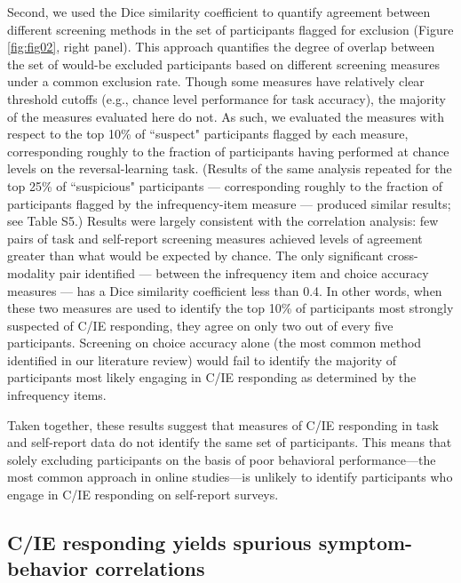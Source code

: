 \documentclass[a4paper,notitlepage,12pt]{article}
\begin{document}
Second, we used the Dice similarity coefficient to quantify agreement between different screening methods in the set of participants flagged for exclusion (Figure \ref{fig:fig02}, right panel). This approach quantifies the degree of overlap between the set of would-be excluded participants based on different screening measures under a common exclusion rate. Though some measures have relatively clear threshold cutoffs (e.g., chance level performance for task accuracy), the majority of the measures evaluated here do not. As such, we evaluated the measures with respect to the top 10\% of ``suspect" participants flagged by each measure, corresponding roughly to the fraction of participants having performed at chance levels on the reversal-learning task. (Results of the same analysis repeated for the top 25\% of ``suspicious" participants --- corresponding roughly to the fraction of participants flagged by the infrequency-item measure --- produced similar results; see Table S5.) Results were largely consistent with the correlation analysis: few pairs of task and self-report screening measures achieved levels of agreement greater than what would be expected by chance. The only significant cross-modality pair identified --- between the infrequency item and choice accuracy measures --- has a Dice similarity coefficient less than 0.4. In other words, when these two measures are used to identify the top 10\% of participants most strongly suspected of C/IE responding, they agree on only two out of every five participants. Screening on choice accuracy alone (the most common method identified in our literature review) would fail to identify the majority of participants most likely engaging in C/IE responding as determined by the infrequency items.

Taken together, these results suggest that measures of C/IE responding in task and self-report data do not identify the same set of participants. This means that solely excluding participants on the basis of poor behavioral performance---the most common approach in online studies---is unlikely to identify participants who engage in C/IE responding on self-report surveys. 

\subsection*{C/IE responding yields spurious symptom-behavior correlations}
\end{document}
